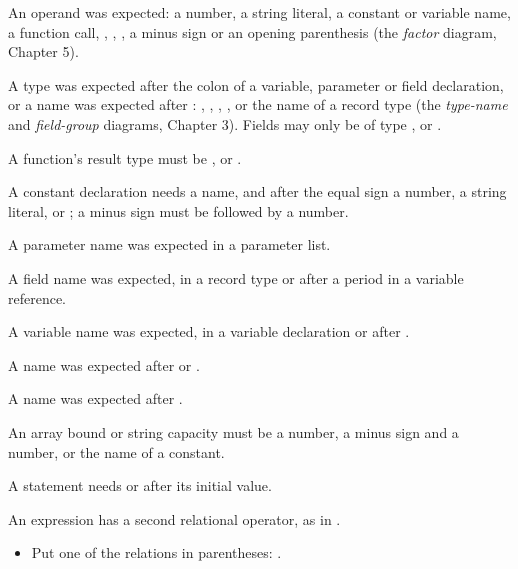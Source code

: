 An operand was expected: a number, a string literal, a constant or
variable name, a function call, , , , a minus
sign or an opening parenthesis (the \textit{factor} diagram, Chapter 5).

A type was expected after the colon of a variable, parameter or field
declaration, or a name was expected after : ,
, , ,  or the name of a record type
(the \textit{type-name} and \textit{field-group} diagrams, Chapter 3).
Fields may only be of type ,  or .

A function's result type must be ,  or .

A constant declaration needs a name, and after the equal sign a number,
a string literal,  or ; a minus sign must be followed by
a number.

A parameter name was expected in a parameter list.

A field name was expected, in a record type or after a period in a
variable reference.

A variable name was expected, in a variable declaration or after .

A name was expected after  or .

A name was expected after .

An array bound or string capacity must be a number, a minus sign and a
number, or the name of a constant.

A  statement needs  or  after its initial value.

An expression has a second relational operator, as in .
\begin{itemize}
\item Put one of the relations in parentheses: .
\end{itemize}

